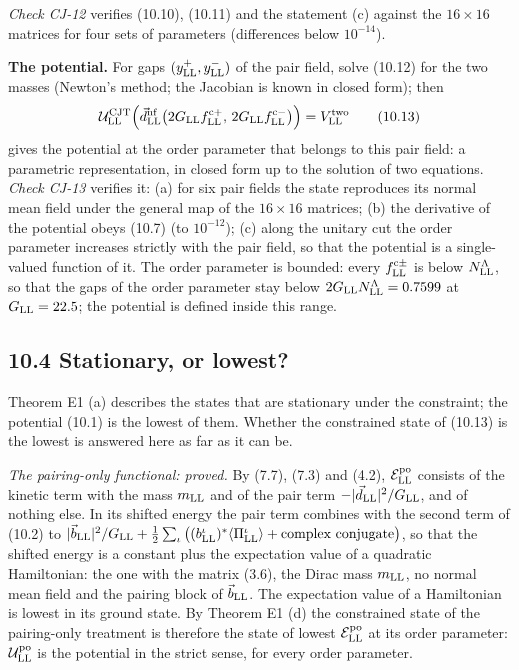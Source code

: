 \documentclass[
  10pt,
]{article}
\begin{document}
\emph{Check CJ-12} verifies (10.10), (10.11) and the statement (c)
against the \(16\times16\) matrices for four sets of parameters
(differences below \(10^{-14}\)).

\textbf{The potential.} For gaps \((y^+_{\rm LL},y^-_{\rm LL})\) of the
pair field, solve (10.12) for the two masses (Newton's method; the
Jacobian is known in closed form); then
\[\mathcal U^{\rm CJT}_{\rm LL}\Big(\vec d^{\rm nf}_{\rm LL}\big(2G_{\rm LL}f^{{\rm c}+}_{\rm LL},\,2G_{\rm LL}f^{{\rm c}-}_{\rm LL}\big)\Big)=V^{\rm two}_{\rm LL}\tag{10.13}\]
gives the potential at the order parameter that belongs to this pair
field: a parametric representation, in closed form up to the solution of
two equations. \emph{Check CJ-13} verifies it: (a) for six pair fields
the state reproduces its normal mean field under the general map of the
\(16\times16\) matrices; (b) the derivative of the potential obeys
(10.7) (to \(10^{-12}\)); (c) along the unitary cut the order parameter
increases strictly with the pair field, so that the potential is a
single-valued function of it. The order parameter is bounded: every
\(f^{{\rm c}\pm}_{\rm LL}\) is below \(N^\Lambda_{\rm LL}\), so that the
gaps of the order parameter stay below
\(2G_{\rm LL}N^\Lambda_{\rm LL}=0.7599\) at \(G_{\rm LL}=22.5\); the
potential is defined inside this range.

\hypertarget{stationary-or-lowest}{%
\subsection{10.4 Stationary, or lowest?}\label{stationary-or-lowest}}

Theorem E1 (a) describes the states that are stationary under the
constraint; the potential (10.1) is the lowest of them. Whether the
constrained state of (10.13) is the lowest is answered here as far as it
can be.

\emph{The pairing-only functional: proved.} By (7.7), (7.3) and (4.2),
\(\mathcal E^{\rm po}_{\rm LL}\) consists of the kinetic term with the
mass \(m_{\rm LL}\) and of the pair term
\(-\lvert\vec d_{\rm LL}\rvert^2/G_{\rm LL}\), and of nothing else. In
its shifted energy the pair term combines with the second term of (10.2)
to
\(\lvert\vec b_{\rm LL}\rvert^2/G_{\rm LL}+\tfrac12\sum_\iota\big((b^\iota_{\rm LL})^*\langle\Pi^\iota_{\rm LL}\rangle+\text{complex conjugate}\big)\),
so that the shifted energy is a constant plus the expectation value of a
quadratic Hamiltonian: the one with the matrix (3.6), the Dirac mass
\(m_{\rm LL}\), no normal mean field and the pairing block of
\(\vec b_{\rm LL}\). The expectation value of a Hamiltonian is lowest in
its ground state. By Theorem E1 (d) the constrained state of the
pairing-only treatment is therefore the state of lowest
\(\mathcal E^{\rm po}_{\rm LL}\) at its order parameter:
\(\mathcal U^{\rm po}_{\rm LL}\) is the potential in the strict sense,
for every order parameter.
\end{document}
